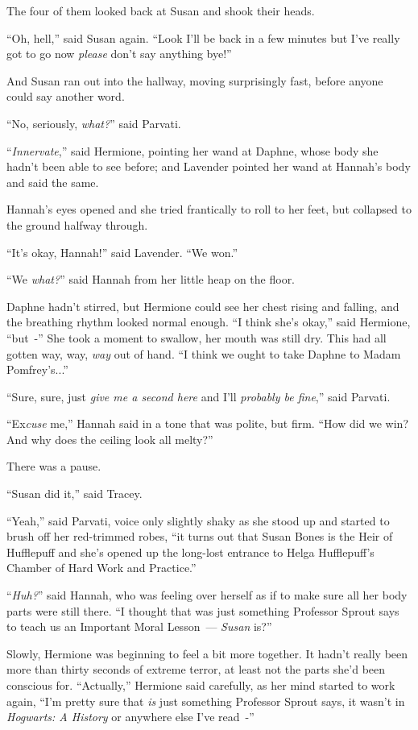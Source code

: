 The four of them looked back at Susan and shook their heads.

``Oh, hell,'' said Susan again. ``Look I'll be back in a few minutes but I've really got to go now \emph{please} don't say anything bye!''

And Susan ran out into the hallway, moving surprisingly fast, before anyone could say another word.

``No, seriously, \emph{what?}'' said Parvati.

``\emph{Innervate},'' said Hermione, pointing her wand at Daphne, whose body she hadn't been able to see before; and Lavender pointed her wand at Hannah's body and said the same.

Hannah's eyes opened and she tried frantically to roll to her feet, but collapsed to the ground halfway through.

``It's okay, Hannah!'' said Lavender. ``We won.''

``We \emph{what?}'' said Hannah from her little heap on the floor.

Daphne hadn't stirred, but Hermione could see her chest rising and falling, and the breathing rhythm looked normal enough. ``I think she's okay,'' said Hermione, ``but~-'' She took a moment to swallow, her mouth was still dry. This had all gotten way, way, \emph{way} out of hand. ``I think we ought to take Daphne to Madam Pomfrey's...''

``Sure, sure, just \emph{give me a second here} and I'll \emph{probably be fine},'' said Parvati.

``Ex\emph{cuse} me,'' Hannah said in a tone that was polite, but firm. ``How did we win? And why does the ceiling look all melty?''

There was a pause.

``Susan did it,'' said Tracey.

``Yeah,'' said Parvati, voice only slightly shaky as she stood up and started to brush off her red-trimmed robes, ``it turns out that Susan Bones is the Heir of Hufflepuff and she's opened up the long-lost entrance to Helga Hufflepuff's Chamber of Hard Work and Practice.''

``\emph{Huh?}'' said Hannah, who was feeling over herself as if to make sure all her body parts were still there. ``I thought that was just something Professor Sprout says to teach us an Important Moral Lesson~--- \emph{Susan} is?''

Slowly, Hermione was beginning to feel a bit more together. It hadn't really been more than thirty seconds of extreme terror, at least not the parts she'd been conscious for. ``Actually,'' Hermione said carefully, as her mind started to work again, ``I'm pretty sure that \emph{is} just something Professor Sprout says, it wasn't in \emph{Hogwarts: A History} or anywhere else I've read~-''

